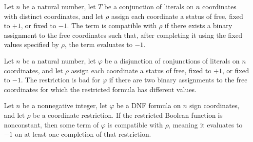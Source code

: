 \begin{definition}
\label{FABL.DNFTerm.Compatible}
\leanok
{}
Let $n$ be a natural number, let $T$ be a conjunction of literals on $n$ coordinates
with distinct coordinates, and let $\rho$ assign each coordinate a status of free, fixed
to $+1$, or fixed to $-1$. The term is compatible with $\rho$ if there exists a binary
assignment to the free coordinates such that, after completing it using the fixed values
specified by $\rho$, the term evaluates to $-1$.
\end{definition}

\begin{definition}
\label{FABL.DNFFormula.IsBadRestriction}
\leanok
{}
Let $n$ be a natural number, let $\varphi$ be a disjunction of conjunctions of literals
on $n$ coordinates, and let $\rho$ assign each coordinate a status of free, fixed to
$+1$, or fixed to $-1$. The restriction is bad for $\varphi$ if there are two binary
assignments to the free coordinates for which the restricted formula has different
values.
\end{definition}

\begin{theorem}
\label{FABL.DNFFormula.exists_compatible_of_badRestriction}
\leanok
{}
Let $n$ be a nonnegative integer, let $\varphi$ be a DNF formula on $n$ sign
coordinates, and let $\rho$ be a coordinate restriction. If the restricted Boolean
function is nonconstant, then some term of $\varphi$ is compatible with $\rho$, meaning
it evaluates to $-1$ on at least one completion of that restriction.
\end{theorem}

